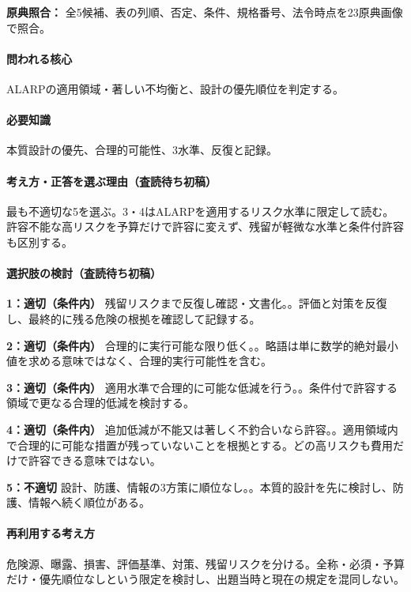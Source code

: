 \noindent\textbf{原典照合：} 全5候補、表の列順、否定、条件、規格番号、法令時点を23原典画像で照合。\par

\paragraph{問われる核心} ALARPの適用領域・著しい不均衡と、設計の優先順位を判定する。

\paragraph{必要知識} 本質設計の優先、合理的可能性、3水準、反復と記録。

\paragraph{考え方・正答を選ぶ理由（査読待ち初稿）} 最も不適切な5を選ぶ。3・4はALARPを適用するリスク水準に限定して読む。許容不能な高リスクを予算だけで許容に変えず、残留が軽微な水準と条件付許容も区別する。

\paragraph{選択肢の検討（査読待ち初稿）}\mbox{}\par

\noindent\textbf{1：適切（条件内）} 残留リスクまで反復し確認・文書化。。評価と対策を反復し、最終的に残る危険の根拠を確認して記録する。\par

\noindent\textbf{2：適切（条件内）} 合理的に実行可能な限り低く。。略語は単に数学的絶対最小値を求める意味ではなく、合理的実行可能性を含む。\par

\noindent\textbf{3：適切（条件内）} 適用水準で合理的に可能な低減を行う。。条件付で許容する領域で更なる合理的低減を検討する。\par

\noindent\textbf{4：適切（条件内）} 追加低減が不能又は著しく不釣合いなら許容。。適用領域内で合理的に可能な措置が残っていないことを根拠とする。どの高リスクも費用だけで許容できる意味ではない。\par

\noindent\textbf{5：不適切} 設計、防護、情報の3方策に順位なし。。本質的設計を先に検討し、防護、情報へ続く順位がある。\par

\paragraph{再利用する考え方} 危険源、曝露、損害、評価基準、対策、残留リスクを分ける。全称・必須・予算だけ・優先順位なしという限定を検討し、出題当時と現在の規定を混同しない。

